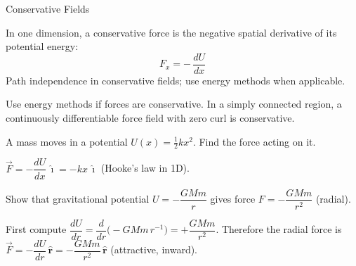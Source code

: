 \begin{KnowledgePoint}{Conservative Fields \Extension}
  \KPFormulas
\begin{formulabox}
  In one dimension, a conservative force is the negative spatial derivative of its potential energy:
  \[
  F_x=-\,\dfrac{dU}{dx}
  \]
  Path independence in conservative fields; use energy methods when applicable.
  \end{formulabox}

  \KPHeuristics
  \begin{heuristicsbox}
  Use energy methods if forces are conservative. In a simply connected region, a continuously differentiable force field with zero curl is conservative.
  \end{heuristicsbox}

  \KPProblems
\begin{cheatproblem}
  A mass moves in a potential $U(x)=\tfrac12 kx^2$. Find the force acting on it.
\begin{solutionbox}
  $\vec F=-\dfrac{dU}{dx}\,\hat\imath=-kx\,\hat\imath$ (Hooke's law in 1D).
\end{solutionbox}
\end{cheatproblem}
\begin{cheatproblem}
  Show that gravitational potential $U=-\dfrac{GMm}{r}$ gives force $F=-\dfrac{GMm}{r^2}$ (radial).
\begin{solutionbox}
  First compute $\dfrac{dU}{dr}=\dfrac{d}{dr}\Big(-GMm\,r^{-1}\Big)=+\dfrac{GMm}{r^2}$. Therefore the radial force is $\vec F=-\dfrac{dU}{dr}\,\hat{\mathbf r}=-\dfrac{GMm}{r^2}\,\hat{\mathbf r}$ (attractive, inward).
\end{solutionbox}
\end{cheatproblem}
\end{KnowledgePoint}

